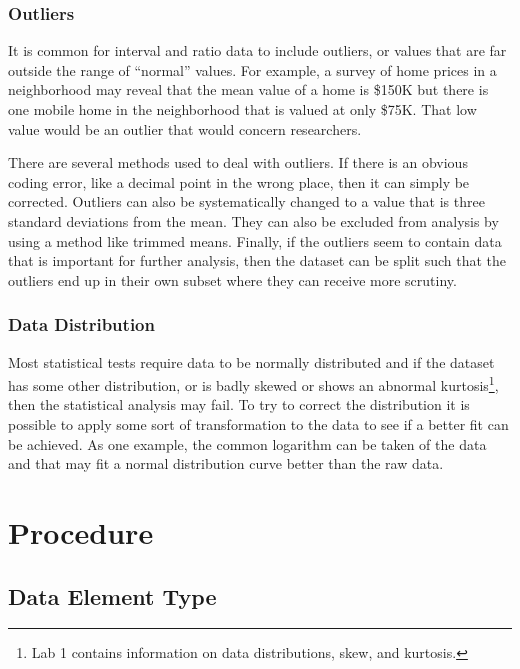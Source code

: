 \subsubsection{Outliers}

It is common for interval and ratio data to include outliers, or values that are far outside the range of ``normal'' values. For example, a survey of home prices in a neighborhood may reveal that the mean value of a home is \$150K but there is one mobile home in the neighborhood that is valued at only \$75K. That low value would be an outlier that would concern researchers.

There are several methods used to deal with outliers. If there is an obvious coding error, like a decimal point in the wrong place, then it can simply be corrected. Outliers can also be systematically changed to a value that is three standard deviations from the mean. They can also be excluded from analysis by using a method like trimmed means. Finally, if the outliers seem to contain data that is important for further analysis, then the dataset can be split such that the outliers end up in their own subset where they can receive more scrutiny.

\subsubsection{Data Distribution}

Most statistical tests require data to be normally distributed and if the dataset has some other distribution, or is badly skewed or shows an abnormal kurtosis\footnote{Lab 1 contains information on data distributions, skew, and kurtosis.}, then the statistical analysis may fail. To try to correct the distribution it is possible to apply some sort of transformation to the data to see if a better fit can be achieved. As one example, the common logarithm can be taken of the data and that may fit a normal distribution curve better than the raw data.

\section{Procedure}


\subsection{Data Element Type}

